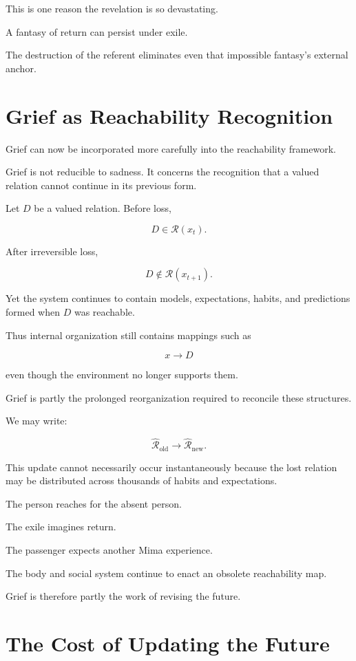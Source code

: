 \documentclass[11pt,oneside]{book}
\theoremstyle{definition}
\theoremstyle{remark}
\newcommand{\R}{\mathcal{R}}
\begin{document}
This is one reason the revelation is so devastating.

A fantasy of return can persist under exile.

The destruction of the referent eliminates even that impossible fantasy's external anchor.

\section{Grief as Reachability Recognition}

Grief can now be incorporated more carefully into the reachability framework.

Grief is not reducible to sadness. It concerns the recognition that a valued relation cannot continue in its previous form.

Let \(D\) be a valued relation. Before loss,

\[
D\in\R(x_t).
\]

After irreversible loss,

\[
D\notin\R(x_{t+1}).
\]

Yet the system continues to contain models, expectations, habits, and predictions formed when \(D\) was reachable.

Thus internal organization still contains mappings such as

\[
x\rightarrow D
\]

even though the environment no longer supports them.

Grief is partly the prolonged reorganization required to reconcile these structures.

We may write:

\[
\widehat{\R}_{\mathrm{old}}
\rightarrow
\widehat{\R}_{\mathrm{new}}.
\]

This update cannot necessarily occur instantaneously because the lost relation may be distributed across thousands of habits and expectations.

The person reaches for the absent person.

The exile imagines return.

The passenger expects another Mima experience.

The body and social system continue to enact an obsolete reachability map.

Grief is therefore partly the work of revising the future.

\section{The Cost of Updating the Future}
\end{document}
